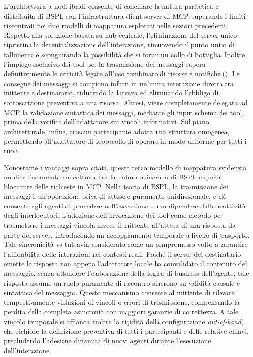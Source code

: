L'architettura a nodi ibridi consente di conciliare la natura paritetica e distribuita di BSPL con l'infrastruttura client-server di MCP, superando i limiti riscontrati nei due modelli di mappatura esplorati nelle sezioni precedenti. Rispetto alla soluzione basata su hub centrale, l'eliminazione del server unico ripristina la decentralizzazione dell'interazione, rimuovendo il punto unico di fallimento e scongiurando la possibilità che si formi un collo di bottiglia. Inoltre, l'impiego esclusivo dei tool per la trasmissione dei messaggi supera definitivamente le criticità legate all'uso combinato di risorse e notifiche (). Le consegne dei messaggi si compiono infatti in un'unica interazione diretta tra mittente e destinatario, riducendo la latenza ed eliminando l'obbligo di sottoscrizione preventiva a una risorsa. Altresì, viene completamente delegata ad MCP la validazione sintattica dei messaggi, mediante gli input schema dei tool, prima della verifica dell'adattatore sui vincoli informativi.
Sul piano architetturale, infine, ciascun partecipante adotta una struttura omogenea, permettendo all'adattatore di protocollo di operare in modo uniforme per tutti i ruoli.

Nonostante i vantaggi sopra citati, questo terzo modello di mappatura evidenzia un disallineamento concettuale tra la natura asincrona di BSPL e quella bloccante delle richieste in MCP. Nella teoria di BSPL, la trasmissione dei messaggi è un'operazione priva di attese e puramente unidirezionale, e ciò consente agli agenti di procedere nell'esecuzione senza dipendere dalla reattività degli interlocutori. L'adozione dell'invocazione dei tool come metodo per trasmettere i messaggi vincola invece il mittente all'attesa di una risposta da parte del server, introducendo un accoppiamento temporale a livello di trasporto. Tale sincronicità va tuttavia considerata come un compromesso volto a garantire l'affidabilità delle interazioni nei contesti reali. Poiché il server del destinatario emette la risposta non appena l'adattatore locale ha convalidato il contenuto del messaggio, senza attendere l'elaborazione della logica di business dell'agente, tale risposta assume un ruolo puramente di riscontro sincrono su validità causale e sintattica del messaggio. Questo meccanismo consente al mittente di rilevare tempestivamente violazioni di vincoli o errori di trasmissione, compensando la perdita della completa asincronia con maggiori garanzie di correttezza. A tale vincolo temporale si affianca inoltre la rigidità della configurazione \emph{out-of-band}, che richiede la definizione preventiva di tutti i partecipanti e delle relative chiavi, precludendo l'adesione dinamica di nuovi agenti durante l'esecuzione dell'interazione.

